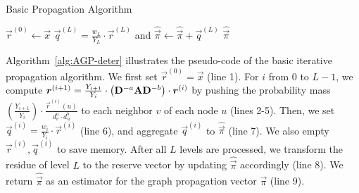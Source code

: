 \begin{algorithm}[t]%
\begin{small}
    \caption{Basic Propagation Algorithm\label{alg:AGP-deter}}
	$\vec{r}^{(0)} \gets \vec{x}$\;
	 $\vec{q}^{(L)}=\frac{w_L}{Y_L}\cdot \vec{r}^{(L)}$ and $\hat{\vec{\pi}} \gets \hat{\vec{\pi}} +\vec{q}^{(L)}$\;
	\Return $\hat{\vec{\pi}}$\;
\end{small}
\end{algorithm}

Algorithm~\ref{alg:AGP-deter} illustrates the pseudo-code of the basic iterative propagation algorithm.  We first set $\vec{r}^{(0)}=\vec{x}$ (line 1). 
For $i$ from $0$ to $L-1$, we compute $\bm{r}^{(i+1)}=\frac{Y_{i+1}}{Y_i}\cdot\left(\mathbf{D}^{-a}\mathbf{A}\mathbf{D}^{-b} \right)\cdot \bm{r}^{(i)}$ by pushing the probability mass  $\left(\frac{Y_{i+1}}{Y_i} \right) \cdot \frac{\vec{r}^{(i)}(u)}{d_v^{a} \cdot d_u^b}$ to each neighbor $v$ of each node $u$ (lines 2-5). 
Then, we set $\vec{q}^{(i)}=\frac{w_i}{Y_i}\cdot \vec{r}^{(i)}$ (line 6), and aggregate $\vec{q}^{(i)}$ to $\hat{\vec{\pi}}$ (line 7). We also empty $\vec{r}^{(i)},\vec{q}^{(i)}$ to save memory. After all $L$ levels are processed, we transform the residue of level $L$ to the reserve vector by updating $\hat{\vec{\pi}}$ accordingly (line 8). We return $\hat{\vec{\pi}}$  as an estimator for the graph propagation vector $\vec{\pi}$ (line 9). 

